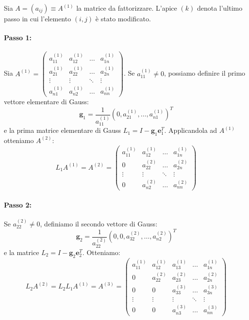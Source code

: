 Sia $A = (a_{ij}) \equiv A^{(1)}$ la matrice da fattorizzare. L'apice $(k)$ denota l'ultimo passo in cui l'elemento $(i,j)$ è stato modificato.

\paragraph{Passo 1:}
Sia $A^{(1)} = \begin{pmatrix}
a_{11}^{(1)} & a_{12}^{(1)} & \dots & a_{1n}^{(1)} \\
a_{21}^{(1)} & a_{22}^{(1)} & \dots & a_{2n}^{(1)} \\
\vdots & \vdots & \ddots & \vdots \\
a_{n1}^{(1)} & a_{n2}^{(1)} & \dots & a_{nn}^{(1)}
\end{pmatrix}$.
Se $a_{11}^{(1)} \neq 0$, possiamo definire il primo vettore elementare di Gauss:
$$ \mathbf{g}_1 = \frac{1}{a_{11}^{(1)}} (0, a_{21}^{(1)}, \dots, a_{n1}^{(1)})^T $$
e la prima matrice elementare di Gauss $L_1 = I - \mathbf{g}_1 \mathbf{e}_1^T$.
Applicandola ad $A^{(1)}$ otteniamo $A^{(2)}$:
$$ L_1 A^{(1)} = A^{(2)} = \begin{pmatrix}
a_{11}^{(1)} & a_{12}^{(1)} & \dots & a_{1n}^{(1)} \\
0 & a_{22}^{(2)} & \dots & a_{2n}^{(2)} \\
\vdots & \vdots & \ddots & \vdots \\
0 & a_{n2}^{(2)} & \dots & a_{nn}^{(2)}
\end{pmatrix} $$

\paragraph{Passo 2:}
Se $a_{22}^{(2)} \neq 0$, definiamo il secondo vettore di Gauss:
$$ \mathbf{g}_2 = \frac{1}{a_{22}^{(2)}} (0, 0, a_{32}^{(2)}, \dots, a_{n2}^{(2)})^T $$
e la matrice $L_2 = I - \mathbf{g}_2 \mathbf{e}_2^T$. Otteniamo:
$$ L_2 A^{(2)} = L_2 L_1 A^{(1)} = A^{(3)} = \begin{pmatrix}
a_{11}^{(1)} & a_{12}^{(1)} & a_{13}^{(1)} & \dots & a_{1n}^{(1)} \\
0 & a_{22}^{(2)} & a_{23}^{(2)} & \dots & a_{2n}^{(2)} \\
0 & 0 & a_{33}^{(3)} & \dots & a_{3n}^{(3)} \\
\vdots & \vdots & \vdots & \ddots & \vdots \\
0 & 0 & a_{n3}^{(3)} & \dots & a_{nn}^{(3)}
\end{pmatrix} $$

